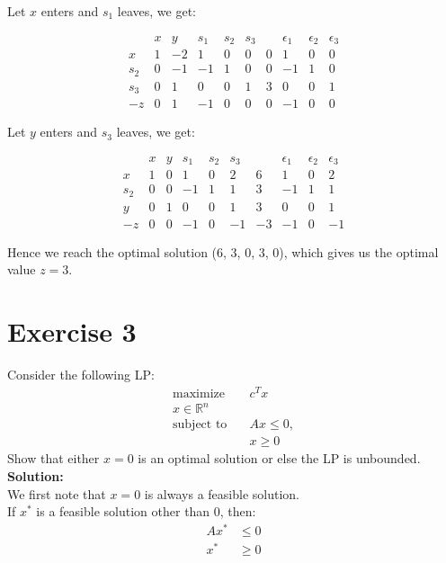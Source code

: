\documentclass{article}
\begin{document}
Let $x$ enters and $s_1$ leaves, we get:

\[
\begin{array}{c|rrrrr|rrrrr}
 & x & y & s_1 & s_2 & s_3 & & \epsilon_1 & \epsilon_2 & \epsilon_3 \\
\hline
x & 1 & -2 & 1 & 0 & 0 & 0 & 1 & 0 & 0 \\
s_2 & 0 & -1 & -1 & 1 & 0 & 0 & -1 & 1 & 0 \\
s_3 & 0 & 1 & 0 & 0 & 1 & 3 & 0 & 0 & 1 \\
\hline
-z & 0 & 1 & -1 & 0 & 0 & 0 & -1 & 0 & 0
\end{array}
\]

Let $y$ enters and $s_3$ leaves, we get:

\[
\begin{array}{c|rrrrr|rrrrr}
 & x & y & s_1 & s_2 & s_3 & & \epsilon_1 & \epsilon_2 & \epsilon_3 \\
\hline
x & 1 & 0 & 1 & 0 & 2 & 6 & 1 & 0 & 2 \\
s_2 & 0 & 0 & -1 & 1 & 1 & 3 & -1 & 1 & 1 \\
y & 0 & 1 & 0 & 0 & 1 & 3 & 0 & 0 & 1 \\
\hline
-z & 0 & 0 & -1 & 0 & -1 & -3 & -1 & 0 & -1
\end{array}
\]

Hence we reach the optimal solution (6, 3, 0, 3, 0), which gives us the optimal value $z = 3$.

\newpage

\section*{Exercise 3}
Consider the following LP:
\begin{align*}
\text{maximize} \quad & c^T x \\
x \in \mathbb{R}^n & \\
\text{subject to} \quad & Ax \leq 0, \\
& x \geq 0
\end{align*}
Show that either $x = 0$ is an optimal solution or else the LP is unbounded. \\

\textbf{Solution:} \\

We first note that $x = 0$ is always a feasible solution. \\

If $x^*$ is a feasible solution other than 0, then:
\begin{align*}
Ax^* &\leq 0 \\
x^* &\geq 0
\end{align*}
\end{document}
